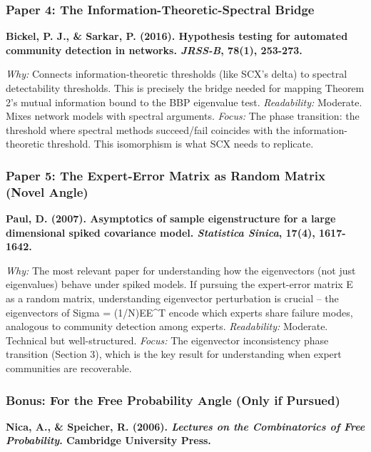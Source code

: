 \documentclass[
  12pt,
]{article}
\begin{document}
\subsubsection{Paper 4: The Information-Theoretic-Spectral
Bridge}\label{paper-4-the-information-theoretic-spectral-bridge}

\textbf{Bickel, P. J., \& Sarkar, P. (2016). Hypothesis testing for
automated community detection in networks. \emph{JRSS-B}, 78(1),
253-273.}

\emph{Why:} Connects information-theoretic thresholds (like SCX's delta)
to spectral detectability thresholds. This is precisely the bridge
needed for mapping Theorem 2's mutual information bound to the BBP
eigenvalue test. \emph{Readability:} Moderate. Mixes network models with
spectral arguments. \emph{Focus:} The phase transition: the threshold
where spectral methods succeed/fail coincides with the
information-theoretic threshold. This isomorphism is what SCX needs to
replicate.

\subsubsection{Paper 5: The Expert-Error Matrix as Random Matrix (Novel
Angle)}\label{paper-5-the-expert-error-matrix-as-random-matrix-novel-angle}

\textbf{Paul, D. (2007). Asymptotics of sample eigenstructure for a
large dimensional spiked covariance model. \emph{Statistica Sinica},
17(4), 1617-1642.}

\emph{Why:} The most relevant paper for understanding how the
eigenvectors (not just eigenvalues) behave under spiked models. If
pursuing the expert-error matrix E as a random matrix, understanding
eigenvector perturbation is crucial -- the eigenvectors of Sigma =
(1/N)EE\^{}T encode which experts share failure modes, analogous to
community detection among experts. \emph{Readability:} Moderate.
Technical but well-structured. \emph{Focus:} The eigenvector
inconsistency phase transition (Section 3), which is the key result for
understanding when expert communities are recoverable.

\subsubsection{Bonus: For the Free Probability Angle (Only if
Pursued)}\label{bonus-for-the-free-probability-angle-only-if-pursued}

\textbf{Nica, A., \& Speicher, R. (2006). \emph{Lectures on the
Combinatorics of Free Probability}. Cambridge University Press.}
\end{document}
